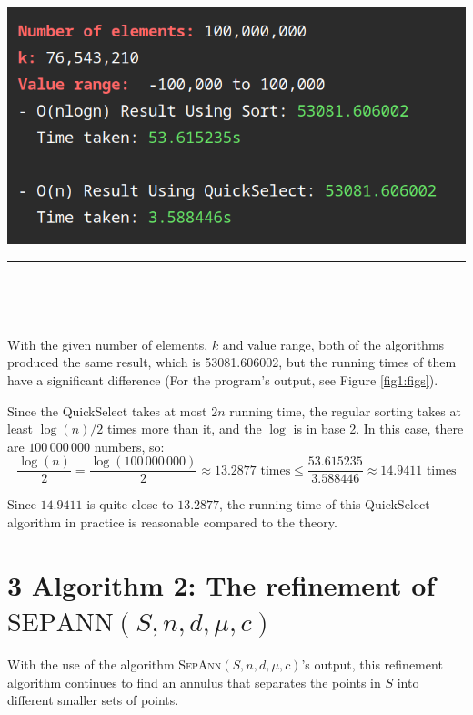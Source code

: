 \documentclass[12pt,english,]{article}
\newcommand{\pnt}[1]{{\scriptstyle#1}}
\let\origfigure\figure
\let\endorigfigure\endfigure
\renewenvironment{figure}[1][2] {
    \expandafter\origfigure\expandafter[H]
} {
    \endorigfigure
}
\begin{document}
\begin{figure}

{\centering \includegraphics[width=0.7\linewidth]{../images_&_data/kth_smallest/100m} 

}

\caption{\label{fig1:figs}The outputs of the $O(n \log n)$ algorithm using regular sorting and the $O(n)$ QuickSelect algorithm that recurses only once.}\label{fig:unnamed-chunk-1}
\end{figure}

\hrule

~

~

With the given number of elements, \(k\) and value range, both of the
algorithms produced the same result, which is 53081.606002, but the
running times of them have a significant difference (For the program's
output, see Figure \ref{fig1:figs}).

Since the QuickSelect takes at most \(2n\) running time, the regular
sorting takes at least \(\log(n)/2\) times more than it, and the
\(\log\) is in base 2. In this case, there are \(100\,000\,000\)
numbers, so:
\[\frac{\log(n)}{2} = \frac{\log(100\,000\,000)}{2} \approx 13.2877 \text{ times} \leq \frac{53.615235}{3.588446} \approx 14.9411 \text{ times}\]

Since \(14.9411\) is quite close to \(13.2877\), the running time of
this QuickSelect algorithm in practice is reasonable compared to the
theory.

\hypertarget{section3}{%
\section{\texorpdfstring{3 \enspace Algorithm 2: The refinement of
\(\mathrm{S\pnt{EP}A\pnt{NN}}(S,n,d,\mu,c)\)}{3 Algorithm 2: The refinement of \textbackslash{}mathrm\{S\textbackslash{}pnt\{EP\}A\textbackslash{}pnt\{NN\}\}(S,n,d,\textbackslash{}mu,c)}}\label{section3}}

With the use of the algorithm \textsc{SepAnn$(S,n,d,\mu,c)$}'s output,
this refinement algorithm continues to find an annulus that separates
the points in \(S\) into different smaller sets of points.
\end{document}
